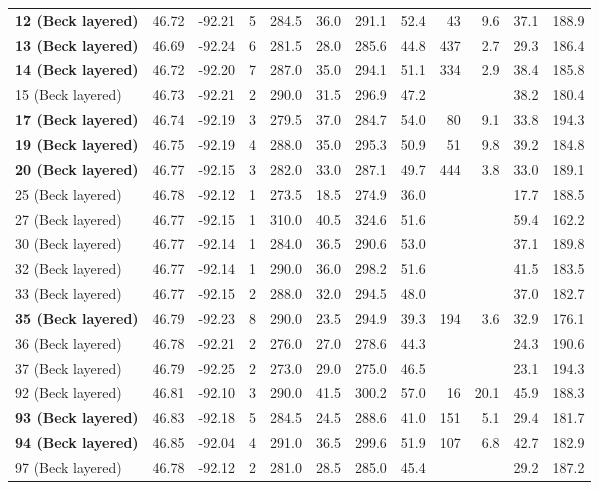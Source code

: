 \documentclass[11pt,letterpaper]{article}
\begin{document}
\begin{table}[h!]
\begin{tabular}{|l|r|r|r|r|r|r|r|r|r|r|r|}
\textbf{12 (Beck layered)	}	&	46.72	&	-92.21	&	5	&	284.5	&	36.0	&	291.1	&	52.4	&	43	&	9.6	&	37.1	&	188.9	\\
\textbf{13 (Beck layered)	}	&	46.69	&	-92.24	&	6	&	281.5	&	28.0	&	285.6	&	44.8	&	437	&	2.7	&	29.3	&	186.4	\\
\textbf{14 (Beck layered)	}	&	46.72	&	-92.20	&	7	&	287.0	&	35.0	&	294.1	&	51.1	&	334	&	2.9	&	38.4	&	185.8	\\
	15 (Beck layered)		&	46.73	&	-92.21	&	2	&	290.0	&	31.5	&	296.9	&	47.2	&		&		&	38.2	&	180.4	\\
\textbf{17 (Beck layered)	}	&	46.74	&	-92.19	&	3	&	279.5	&	37.0	&	284.7	&	54.0	&	80	&	9.1	&	33.8	&	194.3	\\
\textbf{19 (Beck layered)	}	&	46.75	&	-92.19	&	4	&	288.0	&	35.0	&	295.3	&	50.9	&	51	&	9.8	&	39.2	&	184.8	\\
\textbf{20 (Beck layered)	}	&	46.77	&	-92.15	&	3	&	282.0	&	33.0	&	287.1	&	49.7	&	444	&	3.8	&	33.0	&	189.1	\\
	25 (Beck layered)		&	46.78	&	-92.12	&	1	&	273.5	&	18.5	&	274.9	&	36.0	&		&		&	17.7	&	188.5	\\
	27 (Beck layered)		&	46.77	&	-92.15	&	1	&	310.0	&	40.5	&	324.6	&	51.6	&		&		&	59.4	&	162.2	\\
	30 (Beck layered)		&	46.77	&	-92.14	&	1	&	284.0	&	36.5	&	290.6	&	53.0	&		&		&	37.1	&	189.8	\\
	32 (Beck layered)		&	46.77	&	-92.14	&	1	&	290.0	&	36.0	&	298.2	&	51.6	&		&		&	41.5	&	183.5	\\
	33 (Beck layered)		&	46.77	&	-92.15	&	2	&	288.0	&	32.0	&	294.5	&	48.0	&		&		&	37.0	&	182.7	\\
\textbf{35 (Beck layered)	}	&	46.79	&	-92.23	&	8	&	290.0	&	23.5	&	294.9	&	39.3	&	194	&	3.6	&	32.9	&	176.1	\\
	36 (Beck layered)		&	46.78	&	-92.21	&	2	&	276.0	&	27.0	&	278.6	&	44.3	&		&		&	24.3	&	190.6	\\
	37 (Beck layered)		&	46.79	&	-92.25	&	2	&	273.0	&	29.0	&	275.0	&	46.5	&		&		&	23.1	&	194.3	\\
	92 (Beck layered)		&	46.81	&	-92.10	&	3	&	290.0	&	41.5	&	300.2	&	57.0	&	16	&	20.1	&	45.9	&	188.3	\\
\textbf{93 (Beck layered)	}	&	46.83	&	-92.18	&	5	&	284.5	&	24.5	&	288.6	&	41.0	&	151	&	5.1	&	29.4	&	181.7	\\
\textbf{94 (Beck layered)	}	&	46.85	&	-92.04	&	4	&	291.0	&	36.5	&	299.6	&	51.9	&	107	&	6.8	&	42.7	&	182.9	\\
	97 (Beck layered)		&	46.78	&	-92.12	&	2	&	281.0	&	28.5	&	285.0	&	45.4	&		&		&	29.2	&	187.2	\\

\end{tabular}
\end{table}
\end{document}
